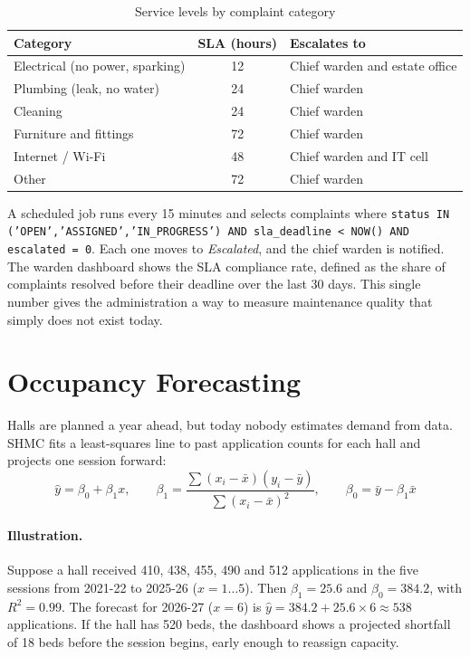 \documentclass[11pt,a4paper]{report}
\begin{document}
\begin{table}[H]
\centering\small
\caption{Service levels by complaint category}\label{tab:sla}
\begin{tabular}{lcl}
\toprule
\textbf{Category} & \textbf{SLA (hours)} & \textbf{Escalates to}\\
\midrule
Electrical (no power, sparking) & 12 & Chief warden and estate office\\
Plumbing (leak, no water) & 24 & Chief warden\\
Cleaning & 24 & Chief warden\\
Furniture and fittings & 72 & Chief warden\\
Internet / Wi-Fi & 48 & Chief warden and IT cell\\
Other & 72 & Chief warden\\
\bottomrule
\end{tabular}
\end{table}

A scheduled job runs every 15 minutes and selects complaints where \texttt{status IN ('OPEN','ASSIGNED','IN\_PROGRESS') AND sla\_deadline < NOW() AND escalated = 0}. Each one moves to \emph{Escalated}, and the chief warden is notified. The warden dashboard shows the SLA compliance rate, defined as the share of complaints resolved before their deadline over the last 30 days. This single number gives the administration a way to measure maintenance quality that simply does not exist today.

\section{Occupancy Forecasting}\label{sec:forecast}
Halls are planned a year ahead, but today nobody estimates demand from data. SHMC fits a least-squares line to past application counts for each hall and projects one session forward:
\begin{equation}
\hat{y} = \beta_0 + \beta_1 x, \qquad \beta_1 = \frac{\sum (x_i-\bar x)(y_i-\bar y)}{\sum (x_i-\bar x)^2}, \qquad \beta_0 = \bar y - \beta_1 \bar x
\end{equation}

\paragraph{Illustration.} Suppose a hall received 410, 438, 455, 490 and 512 applications in the five sessions from 2021-22 to 2025-26 ($x = 1 \ldots 5$). Then $\beta_1 = 25.6$ and $\beta_0 = 384.2$, with $R^2 = 0.99$. The forecast for 2026-27 ($x=6$) is $\hat{y} = 384.2 + 25.6 \times 6 \approx 538$ applications. If the hall has 520 beds, the dashboard shows a projected shortfall of 18 beds before the session begins, early enough to reassign capacity.
\end{document}
